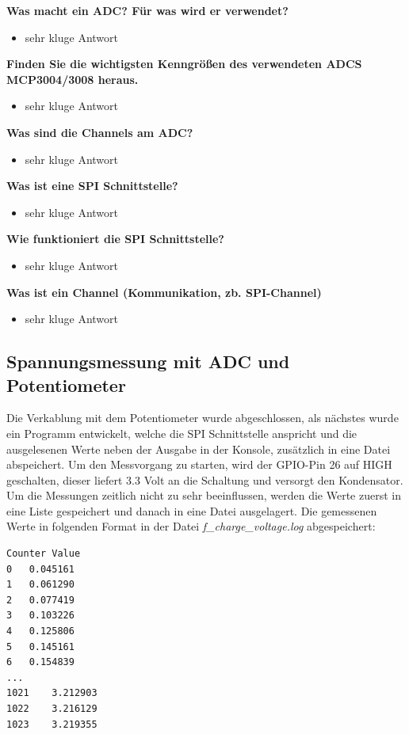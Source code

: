 \documentclass{article}
\begin{document}
\textbf{Was macht ein ADC? Für was wird er verwendet?}
\begin{itemize}
    \item sehr kluge Antwort
\end{itemize}
\textbf{Finden Sie die wichtigsten Kenngrößen des verwendeten ADCS MCP3004/3008 heraus.}
\begin{itemize}
    \item sehr kluge Antwort
\end{itemize}
\textbf{Was sind die Channels am ADC?}
\begin{itemize}
    \item sehr kluge Antwort
\end{itemize}
\textbf{Was ist eine SPI Schnittstelle?}
\begin{itemize}
    \item sehr kluge Antwort
\end{itemize}
\textbf{Wie funktioniert die SPI Schnittstelle?}
\begin{itemize}
    \item sehr kluge Antwort
\end{itemize}
\textbf{Was ist ein Channel (Kommunikation, zb. SPI-Channel)}
\begin{itemize}
    \item sehr kluge Antwort
\end{itemize}

\newpage

\subsection{Spannungsmessung mit ADC und Potentiometer}
Die Verkablung mit dem Potentiometer wurde abgeschlossen, als nächstes wurde ein Programm entwickelt,
welche die SPI Schnittstelle anspricht und die ausgelesenen Werte neben der Ausgabe in der Konsole, zusätzlich in eine Datei abspeichert.
Um den Messvorgang zu starten, wird der GPIO-Pin 26 auf HIGH geschalten, dieser liefert 3.3 Volt an die Schaltung und versorgt den Kondensator.\\
Um die Messungen zeitlich nicht zu sehr beeinflussen, werden die Werte zuerst in eine Liste gespeichert und danach in eine Datei ausgelagert.
Die gemessenen Werte in folgenden Format in der Datei \textit{f\_charge\_voltage.log} abgespeichert:

\begin{lstlisting}
Counter Value
0	0.045161
1	0.061290
2	0.077419
3	0.103226
4	0.125806
5	0.145161
6	0.154839
...
1021	3.212903
1022	3.216129
1023	3.219355
\end{lstlisting}
\end{document}

